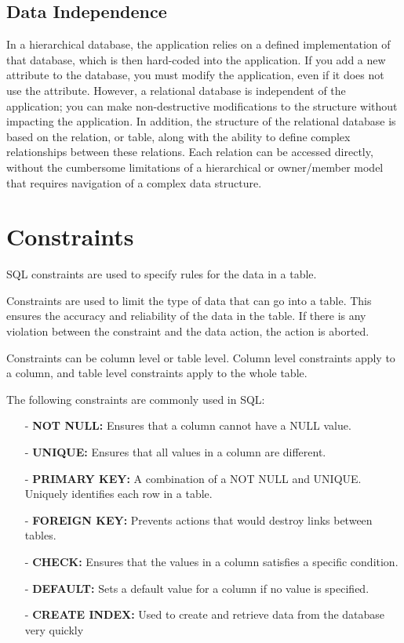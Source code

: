 \documentclass{article}
\begin{document}
\pagebreak

\subsection{Data Independence}

In a hierarchical database, the application relies on a defined implementation of that database, which is then hard-coded into the application. If you add a new attribute to the database, you must modify the application, even if it does not use the attribute. However, a relational database is independent of the application;  you can make non-destructive modifications to the structure without impacting the application. In addition, the structure of the relational database is based on the relation, or table, along with the ability to define complex relationships between these relations. Each relation can be accessed directly, without the cumbersome limitations of a hierarchical or owner/member model that requires navigation of a complex data structure. 

\section{Constraints}

SQL constraints are used to specify rules for the data in a table.

Constraints are used to limit the type of data that can go into a table. This ensures the accuracy and reliability of the data in the table. If there is any violation between the constraint and the data action, the action is aborted.

Constraints can be column level or table level. Column level constraints apply to a column, and table level constraints apply to the whole table.

The following constraints are commonly used in SQL:
\begin{itemize}
    \item[-] \textbf{NOT NULL:} Ensures that a column cannot have a NULL value.
    \item[-] \textbf{UNIQUE:} Ensures that all values in a column are different.
    \item[-] \textbf{PRIMARY KEY:} A combination of a NOT NULL and UNIQUE. Uniquely identifies each row in a table.
    \item[-] \textbf{FOREIGN KEY:} Prevents actions that would destroy links between tables.
    \item[-] \textbf{CHECK:} Ensures that the values in a column satisfies a specific condition.
    \item[-] \textbf{DEFAULT:} Sets a default value for a column if no value is specified.
    \item[-] \textbf{CREATE INDEX:} Used to create and retrieve data from the database very quickly
\end{itemize}
 
\end{document}
